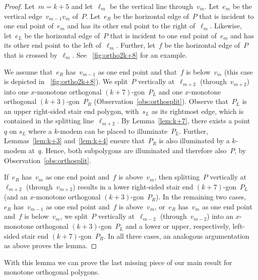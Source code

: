 \documentclass[A4]{article}
\begin{document}
\begin{proof}
Let~$m=k+5$ and let~$\ell_m$ be the vertical line through~$v_m$.
Let~$e_m$ be the vertical edge~$v_{m-1}v_{m}$ of~$P$.
Let~$e_R$ be the horizontal edge of~$P$ that is incident to one end point of~$e_m$ and has its other end point to the right of~$\ell_m$.
Likewise, let~$e_L$ be the horizontal edge of~$P$ that is incident to one end point of~$e_m$ and has its other end point to the left of~$\ell_m$.
Further, let~$f$ be the horizontal edge of~$P$ that is crossed by~$\ell_m$.
See \figurename~\ref{fig:ortho2k+8} for an example. 

We assume that~$e_R$ has~$v_{m-1}$ as one end point and that~$f$ is below~$v_m$ (this case is depicted in \figurename~\ref{fig:ortho2k+8}).
We split~$P$ vertically at~$\ell_{m+2}$ (through~$v_{m+2}$) into one $x$-monotone orthogonal $(k+7)$-gon~$P_L$ and one $x$-monotone orthogonal $(k+3)$-gon~$P_R$ (Observation~\ref{obs:orthosplit}).
Observe that~$P_L$ is an upper right-sided stair end polygon, with~$s_L$ as its rightmost edge, which is contained in the splitting line~$\ell_{m+2}$.
By Lemma~\ref{lem:k+7}, there exists a point~$q$ on $s_L$ where a \mbox{$k$-modem} can be placed to illuminate~$P_L$.
Further, Lemmas~\ref{lem:k+3} and~\ref{lem:k+4} ensure that~$P_R$ is also illuminated by a \mbox{$k$-modem} at~$q$.
Hence, both subpolygons are illuminated and therefore also~$P$, by Observation~\ref{obs:orthosplit}.

If~$e_R$ has~$v_{m}$ as one end point and~$f$ is above~$v_m$, then splitting~$P$ vertically at~$\ell_{m+2}$ (through~$v_{m+2}$) results in a lower right-sided stair end $(k+7)$-gon~$P_L$ (and an $x$-monotone orthogonal $(k+3)$-gon~$P_R$).
In the remaining two cases, $e_R$ has~$v_{m-1}$ as one end point and~$f$ is above~$v_m$, or~$e_R$ has~$v_{m}$ as one end point and~$f$ is below~$v_m$, we split~$P$ vertically at~$\ell_{m-2}$ (through~$v_{m-2}$) into an $x$-monotone orthogonal $(k+3)$-gon~$P_L$ and a lower or upper, respectively, left-sided stair end $(k+7)$-gon~$P_R$.
In all three cases, an analogous argumentation as above proves the lemma. \end{proof}

With this lemma we can prove the last missing piece of our main result for monotone orthogonal polygons.
\end{document}
